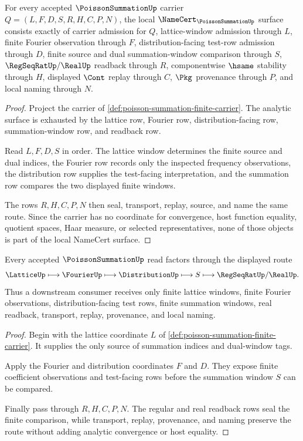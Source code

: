 \begin{theorem}
\label{thm:poisson-summation-namecert-obligations}
For every accepted $\PoissonSummationUp$ carrier $Q=(L,F,D,S,R,H,C,P,N)$, the local $\NameCert_{\PoissonSummationUp}$ surface consists exactly of carrier admission for $Q$, lattice-window admission through $L$, finite Fourier observation through $F$, distribution-facing test-row admission through $D$, finite source and dual summation-window comparison through $S$, $\RegSeqRatUp/\RealUp$ readback through $R$, componentwise $\hsame$ stability through $H$, displayed $\Cont$ replay through $C$, $\Pkg$ provenance through $P$, and local naming through $N$.
\end{theorem}
\begin{proof}
Project the carrier of \autoref{def:poisson-summation-finite-carrier}. The analytic surface is exhausted by the lattice row, Fourier row, distribution-facing row, summation-window row, and readback row.

Read $L,F,D,S$ in order. The lattice window determines the finite source and dual indices, the Fourier row records only the inspected frequency observations, the distribution row supplies the test-facing interpretation, and the summation row compares the two displayed finite windows.

The rows $R,H,C,P,N$ then seal, transport, replay, source, and name the same route. Since the carrier has no coordinate for convergence, host function equality, quotient spaces, Haar measure, or selected representatives, none of those objects is part of the local NameCert surface.
\end{proof}

\begin{theorem}
\label{thm:poisson-summation-fourier-lattice-route}
Every accepted $\PoissonSummationUp$ read factors through the displayed route
$$
\LatticeUp \longmapsto \FourierUp \longmapsto \DistributionUp \longmapsto S \longmapsto \RegSeqRatUp/\RealUp .
$$
Thus a downstream consumer receives only finite lattice windows, finite Fourier observations, distribution-facing test rows, finite summation windows, real readback, transport, replay, provenance, and local naming.
\end{theorem}
\begin{proof}
Begin with the lattice coordinate $L$ of \autoref{def:poisson-summation-finite-carrier}. It supplies the only source of summation indices and dual-window tags.

Apply the Fourier and distribution coordinates $F$ and $D$. They expose finite coefficient observations and test-facing rows before the summation window $S$ can be compared.

Finally pass through $R,H,C,P,N$. The regular and real readback rows seal the finite comparison, while transport, replay, provenance, and naming preserve the route without adding analytic convergence or host equality.
\end{proof}

